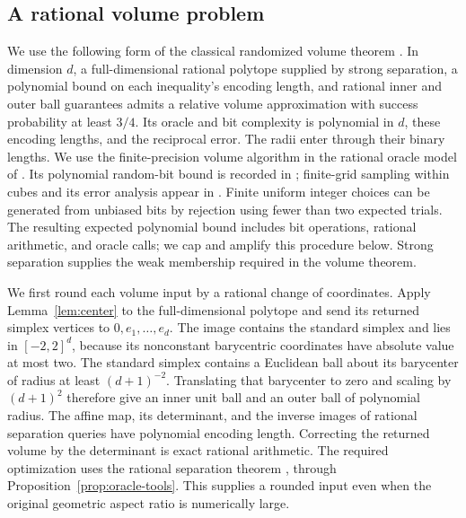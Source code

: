 \subsection{A rational volume problem}

We use the following form of the classical randomized volume theorem
\cite{DFK1991,DyerFrieze1991}. In dimension $d$, a full-dimensional
rational polytope supplied by strong separation, a polynomial bound
on each inequality's encoding length, and rational inner and outer
ball guarantees admits a relative volume approximation with success
probability at least $3/4$. Its oracle and bit complexity is polynomial
in $d$, these encoding lengths, and the reciprocal error. The radii
enter through their binary lengths. We use the finite-precision volume
algorithm in the rational oracle model of
\cite[Section~2]{DyerFrieze1991}. Its polynomial random-bit bound is
recorded in \cite[Section~6]{DyerFrieze1991}; finite-grid sampling within
cubes and its error analysis appear in
\cite[algorithm Step~2 and its finite-grid error analysis]{DFK1991}.
Finite uniform integer choices can be generated from unbiased bits by
rejection using fewer than two expected trials. The resulting expected
polynomial bound includes bit operations, rational arithmetic, and
oracle calls; we cap and amplify this procedure below. Strong separation
supplies the weak membership required in the volume theorem.

We first round each volume input by a rational change of coordinates.
Apply Lemma~\ref{lem:center} to the full-dimensional
polytope and send its returned simplex vertices to $0,e_1,\ldots,e_d$.
The image contains the standard simplex and lies in $[-2,2]^d$,
because its nonconstant barycentric coordinates have absolute value
at most two. The standard simplex contains a Euclidean ball about
its barycenter of radius at least $(d+1)^{-2}$. Translating that
barycenter to zero and scaling by $(d+1)^2$ therefore give an inner
unit ball and an outer ball of polynomial radius. The affine map,
its determinant, and the inverse images of rational separation queries
have polynomial encoding length. Correcting the returned volume by
the determinant is exact rational arithmetic. The required optimization
uses the rational separation theorem \cite{GLS1988}, through
Proposition~\ref{prop:oracle-tools}. This supplies a rounded input
even when the original geometric aspect ratio is numerically large.

